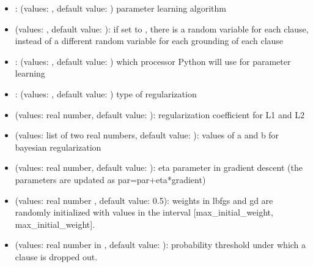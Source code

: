 \documentclass[letterpaper,10pt,english]{sphinxmanual}
\begin{document}
\begin{itemize}
\item {} 
\sphinxAtStartPar
{}: (values: , default value: ) parameter learning algorithm

\item {} 
\sphinxAtStartPar
{} (values: , default value: ): if set to , there is a random variable for each clause, instead of a different random variable for each grounding of each clause

\item {} 
\sphinxAtStartPar
{}: (values: , default value: ) which processor Python will use for parameter learning

\item {} 
\sphinxAtStartPar
{}: (values: , default value: ) type of regularization

\item {} 
\sphinxAtStartPar
{} (values: real number, default value: ): regularization coefficient for L1 and L2

\item {} 
\sphinxAtStartPar
{} (values: list of two real numbers, default value: \sphinxcode{\sphinxupquote{{[}0,10{]}}}): values of a and b for bayesian regularization

\item {} 
\sphinxAtStartPar
{} (values: real number, default value: ): eta parameter in gradient descent (the parameters are updated as par=par+eta*gradient)

\item {} 
\sphinxAtStartPar
{} (values: real number , default value: 0.5): weights in lbfgs and gd are randomly initialized with values in the interval {[}\sphinxhyphen{}max\_initial\_weight, max\_initial\_weight{]}.

\item {} 
\sphinxAtStartPar
{} (values: real number in \sphinxcode{\sphinxupquote{{[}0,1{]}}}, default value: ):  probability threshold under which a clause is dropped out.


\end{itemize}
\end{document}

